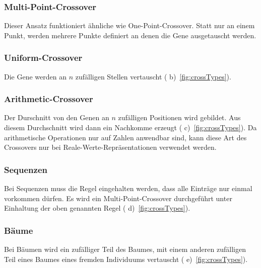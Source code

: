       \subsubsection{Multi-Point-Crossover}

        Dieser Ansatz funktioniert ähnliche wie One-Point-Crossover.
        Statt nur an einem Punkt, werden mehrere Punkte definiert an denen die Gene ausgetauscht werden.

      \subsubsection{Uniform-Crossover}

        Die Gene werden an \(n\) zufälligen Stellen vertauscht ( b)~\vref{fig:crossTypes}).

      \subsubsection{Arithmetic-Crossover}

        Der Durschnitt von den Genen an \(n\) zufälligen Positionen wird gebildet.
        Aus diesem Durchschnitt wird dann ein Nachkomme erzeugt ( c)~\vref{fig:crossTypes}).
        Da arithmetische Operationen nur auf Zahlen anwendbar sind,
        kann diese Art des Crossovers nur bei Reale-Werte-Repräsentationen verwendet werden.

      \subsubsection{Sequenzen}

        Bei Sequenzen muss die Regel eingehalten werden, dass alle Einträge nur einmal vorkommen dürfen.
        Es wird ein Multi-Point-Crossover durchgeführt unter Einhaltung der oben genannten Regel ( d)~\vref{fig:crossTypes}).

      \subsubsection{Bäume}

        Bei Bäumen wird ein zufälliger Teil des Baumes,
        mit einem anderen zufälligen Teil eines Baumes eines fremden Individuums vertauscht ( e)~\vref{fig:crossTypes}).

